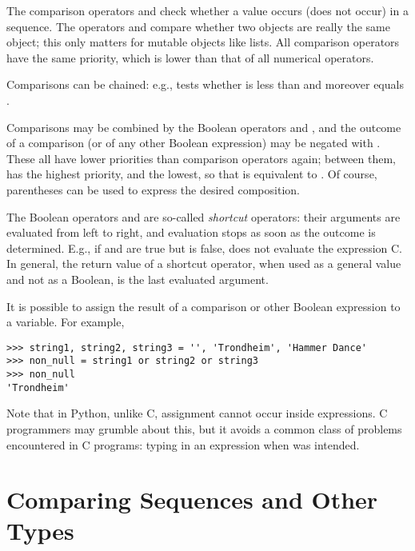 \documentclass{manual}
\begin{document}
The comparison operators  and  check whether a value
occurs (does not occur) in a sequence.  The operators  and
 compare whether two objects are really the same object; this
only matters for mutable objects like lists.  All comparison operators
have the same priority, which is lower than that of all numerical
operators.

Comparisons can be chained: e.g.,  tests whether
 is less than  and moreover  equals .

Comparisons may be combined by the Boolean operators  and
, and the outcome of a comparison (or of any other Boolean
expression) may be negated with .  These all have lower
priorities than comparison operators again; between them,  has
the highest priority, and  the lowest, so that
 is equivalent to .  Of
course, parentheses can be used to express the desired composition.

The Boolean operators  and  are so-called
\emph{shortcut} operators: their arguments are evaluated from left to
right, and evaluation stops as soon as the outcome is determined.
E.g., if  and  are true but  is false,  does not evaluate the expression C.  In general, the
return value of a shortcut operator, when used as a general value and
not as a Boolean, is the last evaluated argument.

It is possible to assign the result of a comparison or other Boolean
expression to a variable.  For example,

\begin{verbatim}
>>> string1, string2, string3 = '', 'Trondheim', 'Hammer Dance'
>>> non_null = string1 or string2 or string3
>>> non_null
'Trondheim'
\end{verbatim}

Note that in Python, unlike C, assignment cannot occur inside expressions.
C programmers may grumble about this, but it avoids a common class of
problems encountered in C programs: typing \code{=} in an expression when
\code{==} was intended.

\section{Comparing Sequences and Other Types \label{comparing}}
\end{document}
